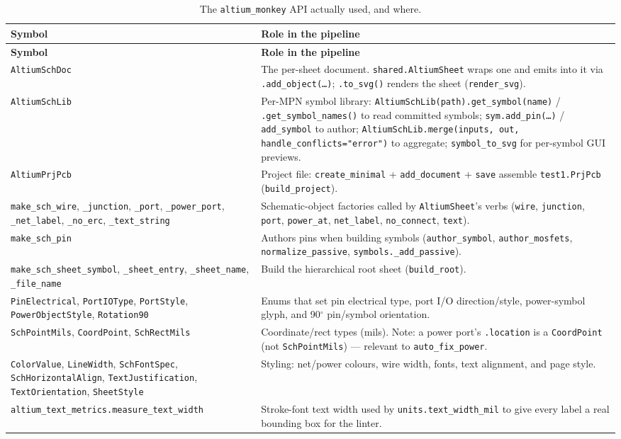 \documentclass[11pt]{article}
\newcommand{\file}[1]{\texttt{#1}}
\newcommand{\mod}[1]{\texttt{#1}}
\begin{document}
\begin{longtable}{p{} p{}}
\caption{The \mod{altium\_monkey} API actually used, and where.}\label{tab:monkey}\\
\toprule
\textbf{Symbol} & \textbf{Role in the pipeline}\\
\midrule
\endfirsthead
\toprule
\textbf{Symbol} & \textbf{Role in the pipeline}\\
\midrule
\endhead
\mod{AltiumSchDoc} & The per-sheet document. \mod{shared.AltiumSheet} wraps one and emits into it via \texttt{.add\_object(\dots)}; \texttt{.to\_svg()} renders the sheet (\mod{render\_svg}).\\
\mod{AltiumSchLib} & Per-MPN symbol library: \texttt{AltiumSchLib(path).get\_symbol(name)} / \texttt{.get\_symbol\_names()} to read committed symbols; \texttt{sym.add\_pin(\dots)} / \texttt{add\_symbol} to author; \texttt{AltiumSchLib.merge(inputs, out, handle\_conflicts="error")} to aggregate; \texttt{symbol\_to\_svg} for per-symbol GUI previews.\\
\mod{AltiumPrjPcb} & Project file: \texttt{create\_minimal} + \texttt{add\_document} + \texttt{save} assemble \file{test1.PrjPcb} (\mod{build\_project}).\\
\texttt{make\_sch\_wire}, \texttt{\_junction}, \texttt{\_port}, \texttt{\_power\_port}, \texttt{\_net\_label}, \texttt{\_no\_erc}, \texttt{\_text\_string} & Schematic-object factories called by \mod{AltiumSheet}'s verbs (\texttt{wire}, \texttt{junction}, \texttt{port}, \texttt{power\_at}, \texttt{net\_label}, \texttt{no\_connect}, \texttt{text}).\\
\texttt{make\_sch\_pin} & Authors pins when building symbols (\mod{author\_symbol}, \mod{author\_mosfets}, \mod{normalize\_passive}, \mod{symbols.\_add\_passive}).\\
\texttt{make\_sch\_sheet\_symbol}, \texttt{\_sheet\_entry}, \texttt{\_sheet\_name}, \texttt{\_file\_name} & Build the hierarchical root sheet (\mod{build\_root}).\\
\mod{PinElectrical}, \mod{PortIOType}, \mod{PortStyle}, \mod{PowerObjectStyle}, \mod{Rotation90} & Enums that set pin electrical type, port I/O direction/style, power-symbol glyph, and 90$^\circ$ pin/symbol orientation.\\
\mod{SchPointMils}, \mod{CoordPoint}, \mod{SchRectMils} & Coordinate/rect types (mils). Note: a power port's \texttt{.location} is a \mod{CoordPoint} (not \mod{SchPointMils}) --- relevant to \mod{auto\_fix\_power}.\\
\mod{ColorValue}, \mod{LineWidth}, \mod{SchFontSpec}, \mod{SchHorizontalAlign}, \mod{TextJustification}, \mod{TextOrientation}, \mod{SheetStyle} & Styling: net/power colours, wire width, fonts, text alignment, and page style.\\
\texttt{altium\_text\_metrics.measure\_text\_width} & Stroke-font text width used by \mod{units.text\_width\_mil} to give every label a real bounding box for the linter.\\
\bottomrule
\end{longtable}
\end{document}

